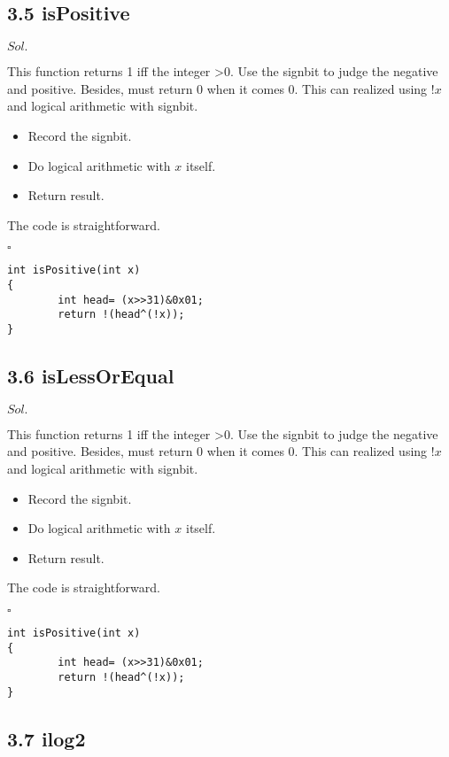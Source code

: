\documentclass[a4paper, 11pt]{article}
\newenvironment{sol}[1] {\par \noindent $#1.$} {\par \hfill $\square$}
\begin{document}
\subsection*{3.5 isPositive}

\begin{sol}{Sol}

This function returns 1 iff the integer \textgreater 0. Use the signbit to judge the negative and positive. Besides, must return 0 when it comes 0. This can realized using $!x$ and logical arithmetic with signbit.

\begin{itemize}
    \item Record the signbit.
    \item Do logical arithmetic with $x$ itself.
    \item Return result.
\end{itemize}

The code is straightforward.
\end{sol}
\begin{lstlisting}
int isPositive(int x)
{
        int head= (x>>31)&0x01;
        return !(head^(!x));
}
\end{lstlisting}

\subsection*{3.6 isLessOrEqual}

\begin{sol}{Sol}

This function returns 1 iff the integer \textgreater 0. Use the signbit to judge the negative and positive. Besides, must return 0 when it comes 0. This can realized using $!x$ and logical arithmetic with signbit.

\begin{itemize}
    \item Record the signbit.
    \item Do logical arithmetic with $x$ itself.
    \item Return result.
\end{itemize}

The code is straightforward.
\end{sol}
\begin{lstlisting}
int isPositive(int x)
{
        int head= (x>>31)&0x01;
        return !(head^(!x));
}
\end{lstlisting}

\subsection*{3.7 ilog2}
\end{document}
